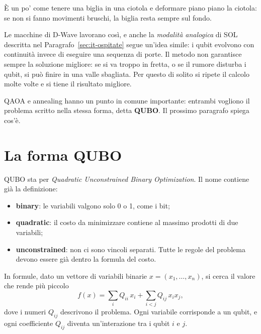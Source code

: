 È un po' come tenere una biglia in una ciotola e deformare piano piano la
ciotola: se non si fanno movimenti bruschi, la biglia resta sempre sul fondo.

Le macchine di D-Wave lavorano così, e anche la \textit{modalità analogica} di
SOL descritta nel Paragrafo~\ref{sec:it-ospitate} segue un'idea simile: i qubit
evolvono con continuità invece di eseguire una sequenza di porte. Il metodo
non garantisce sempre la soluzione migliore: se si va troppo in fretta, o se
il rumore disturba i qubit, si può finire in una valle sbagliata. Per questo
di solito si ripete il calcolo molte volte e si tiene il risultato migliore.

\begin{notabox}
  QAOA e annealing hanno un punto in comune importante: entrambi vogliono il
  problema scritto nella stessa forma, detta \textbf{QUBO}. Il prossimo
  paragrafo spiega cos'è.
\end{notabox}

\section{La forma QUBO}
\label{sec:alg-qubo}

QUBO sta per \textit{Quadratic Unconstrained Binary Optimization}. Il nome
contiene già la definizione:

\begin{itemize}
  \item \textbf{binary}: le variabili valgono solo 0 o 1, come i bit;
  \item \textbf{quadratic}: il costo da minimizzare contiene al massimo
    prodotti di due variabili;
  \item \textbf{unconstrained}: non ci sono vincoli separati. Tutte le regole
    del problema devono essere già dentro la formula del costo.
\end{itemize}

In formule, dato un vettore di variabili binarie $x = (x_1, \dots, x_n)$, si
cerca il valore che rende più piccolo
\begin{equation}
  f(x) = \sum_{i} Q_{ii}\, x_i + \sum_{i<j} Q_{ij}\, x_i x_j ,
  \label{eq:qubo}
\end{equation}
dove i numeri $Q_{ij}$ descrivono il problema. Ogni variabile corrisponde a un
qubit, e ogni coefficiente $Q_{ij}$ diventa un'interazione tra i qubit $i$ e
$j$.

